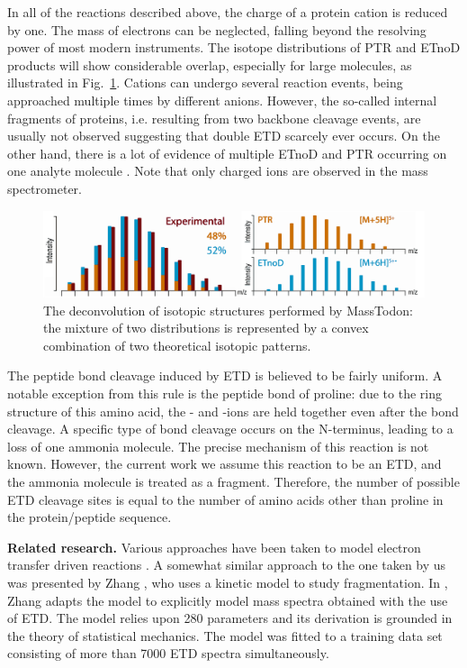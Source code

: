 \documentclass{llncs}
\begin{document}
In all of the reactions described above, the charge of a protein cation is reduced by one. The mass of electrons can be neglected, falling beyond the resolving power of most modern instruments. The isotope distributions of PTR and ETnoD products will show considerable overlap, especially for large molecules, as illustrated in Fig.~\ref{fig::massTodon}. Cations can undergo several reaction events, being approached multiple times by different anions. However, the so-called internal fragments of proteins, i.e. resulting from two backbone cleavage events, are usually not observed suggesting that double ETD scarcely ever occurs. On the other hand, there is a lot of evidence of multiple ETnoD and PTR occurring on one analyte molecule  \cite{Lermyte2015-li}. Note that only charged ions are observed in the mass spectrometer.
\begin{figure}[h]\centering
        \includegraphics[width=.8\textwidth]{masstodon.png}
        \caption{The deconvolution of isotopic structures performed by {\sc MassTodon}: the mixture of two distributions is represented by a convex combination of two theoretical isotopic patterns.}\label{fig::massTodon}
\end{figure}


The peptide bond cleavage induced by ETD is believed to be fairly uniform. A notable exception from this rule is the peptide bond of proline: due to the ring structure of this amino acid, the - and -ions are held together even after the  bond cleavage. A specific type of  bond cleavage occurs on the N-terminus, leading to a loss of one ammonia molecule. The precise mechanism of this reaction is not known. However, the current work we assume this reaction to be an ETD, and the ammonia molecule is treated as a  fragment. Therefore, the number of possible ETD cleavage sites is equal to the number of amino acids other than proline in the protein/peptide sequence.

\textbf{Related research.}
Various approaches have been taken to model electron transfer driven reactions \cite{Breuker2004-az,Simons2010-gy,Zhurov2013-ua,Turecek2013-fq}. A somewhat similar approach to the one taken by us was presented by Zhang \cite{Zhang2004-fp,Zhang2005-jn}, who uses a kinetic model to study fragmentation.
In \cite{Zhang2010-fp}, Zhang adapts the model to explicitly model mass spectra obtained with the use of ETD. The model relies upon 280 parameters and its derivation is grounded in the theory of statistical mechanics. The model was fitted to a training data set consisting of more than 7000 ETD spectra simultaneously.
\end{document}
